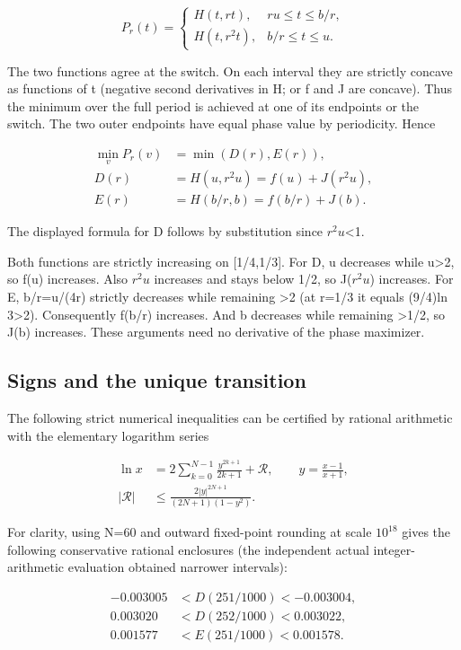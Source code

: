 \documentclass[11pt]{article}
\begin{document}
\[
P_r(t)=\begin{cases}H(t,rt),&ru\leq t\leq b/r,\\H(t,r^2t),&b/r\leq t\leq u.\end{cases}
\]

The two functions agree at the switch. On each interval they are strictly concave as functions of t (negative second derivatives in H; or f and J are concave). Thus the minimum over the full period is achieved at one of its endpoints or the switch. The two outer endpoints have equal phase value by periodicity. Hence

\[
\begin{aligned}\min_v P_r(v)&=\min(D(r),E(r)),\\D(r)&=H(u,r^2u)=f(u)+J(r^2u),\\E(r)&=H(b/r,b)=f(b/r)+J(b).\end{aligned}
\]

The displayed formula for D follows by substitution since $r^2u$<1.

Both functions are strictly increasing on [1/4,1/3]. For D, u decreases while u>2, so f(u) increases. Also $r^2u$ increases and stays below 1/2, so J($r^2u$) increases. For E, b/r=u/(4r) strictly decreases while remaining >2 (at r=1/3 it equals (9/4)ln 3>2). Consequently f(b/r) increases. And b decreases while remaining >1/2, so J(b) increases. These arguments need no derivative of the phase maximizer.

\subsection{Signs and the unique transition}

The following strict numerical inequalities can be certified by rational arithmetic with the elementary logarithm series

\[
\begin{aligned}\ln x&=2\sum_{k=0}^{N-1}\frac{y^{2k+1}}{2k+1}+\mathcal R,\qquad y=\frac{x-1}{x+1},\\
|\mathcal R|&\leq\frac{2|y|^{2N+1}}{(2N+1)(1-y^2)}.\end{aligned}
\]

For clarity, using N=60 and outward fixed-point rounding at scale $10^{18}$ gives the following conservative rational enclosures (the independent actual integer-arithmetic evaluation obtained narrower intervals):

\[
\begin{aligned}-0.003005&<D(251/1000)<-0.003004,\\
0.003020&<D(252/1000)<0.003022,\\
0.001577&<E(251/1000)<0.001578.\end{aligned}
\]
\end{document}
